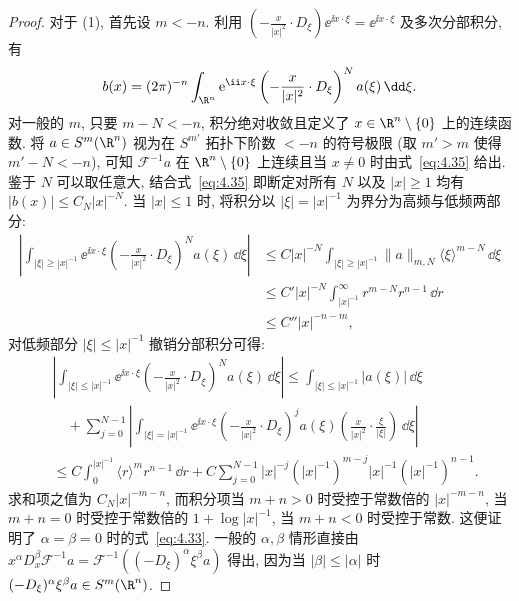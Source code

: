 \begin{proof}
对于 (1), 首先设 $m < -n$. 利用 $(-\frac{x}{|x|^2} \cdot D_\xi) \ee^{\ii x \cdot \xi} = \ee^{\ii x \cdot \xi}$ 及多次分部积分, 有
\begin{equation}\label{eq:4.35}
    b(x) = (2\pi)^{-n} \int_{\R^n} \ee^{\ii x \cdot \xi} \left( -\frac{x}{|x|^2} \cdot D_\xi \right)^N a(\xi) \,\dd\xi.
\end{equation}
对一般的 $m$, 只要 $m - N < -n$, 积分绝对收敛且定义了 $x \in \R^n \setminus \{0\}$ 上的连续函数. 将 $a \in S^m(\R^n)$ 视为在 $S^{m'}$ 拓扑下阶数 $< -n$ 的符号极限 (取 $m' > m$ 使得 $m' - N < -n$), 可知 $\mathcal{F}^{-1} a$ 在 $\R^n \setminus \{0\}$ 上连续且当 $x \neq 0$ 时由式~\eqref{eq:4.35} 给出. 鉴于 $N$ 可以取任意大, 结合式~\eqref{eq:4.35} 即断定对所有 $N$ 以及 $|x| \ge 1$ 均有 $|b(x)| \le C_N |x|^{-N}$. 当 $|x| \le 1$ 时, 将积分以 $|\xi| = |x|^{-1}$ 为界分为高频与低频两部分:
\begin{equation}\label{eq:4.36}
    \begin{aligned}
        \left| \int_{|\xi| \ge |x|^{-1}} \ee^{\ii x \cdot \xi} \left( -\frac{x}{|x|^2} \cdot D_\xi \right)^N a(\xi) \,\dd\xi \right|
        &\le C |x|^{-N} \int_{|\xi| \ge |x|^{-1}} \|a\|_{m, N} \langle \xi \rangle^{m-N} \,\dd\xi \\
        &\le C' |x|^{-N} \int_{|x|^{-1}}^\infty r^{m-N} r^{n-1} \,\dd r \\
        &\le C'' |x|^{-n-m},
    \end{aligned}
\end{equation}
对低频部分 $|\xi| \le |x|^{-1}$ 撤销分部积分可得:
\begin{equation}\label{eq:4.37}
    \begin{aligned}
        &\left| \int_{|\xi| \le |x|^{-1}} \ee^{\ii x \cdot \xi} \left( -\frac{x}{|x|^2} \cdot D_\xi \right)^N a(\xi) \,\dd\xi \right|
        \le \int_{|\xi| \le |x|^{-1}} |a(\xi)| \,\dd\xi \\
        &\quad + \sum_{j=0}^{N-1} \left| \int_{|\xi| = |x|^{-1}} \ee^{\ii x \cdot \xi} \left( -\frac{x}{|x|^2} \cdot D_\xi \right)^j a(\xi) \left( \frac{x}{|x|^2} \cdot \frac{\xi}{|\xi|} \right) \,\dd\xi \right| \\
        &\le C \int_0^{|x|^{-1}} \langle r \rangle^m r^{n-1} \,\dd r
        + C \sum_{j=0}^{N-1} |x|^{-j} (|x|^{-1})^{m-j} |x|^{-1} (|x|^{-1})^{n-1}.
    \end{aligned}
\end{equation}
求和项之值为 $C_N |x|^{-m-n}$, 而积分项当 $m + n > 0$ 时受控于常数倍的 $|x|^{-m-n}$, 当 $m + n = 0$ 时受控于常数倍的 $1 + \log |x|^{-1}$, 当 $m + n < 0$ 时受控于常数. 这便证明了 $\alpha = \beta = 0$ 时的式~\eqref{eq:4.33}. 一般的 $\alpha, \beta$ 情形直接由 $x^\alpha D_x^\beta \mathcal{F}^{-1} a = \mathcal{F}^{-1}((-D_\xi)^\alpha \xi^\beta a)$ 得出, 因为当 $|\beta| \le |\alpha|$ 时 $(-D_\xi)^\alpha \xi^\beta a \in S^m(\R^n)$.


\end{proof}
